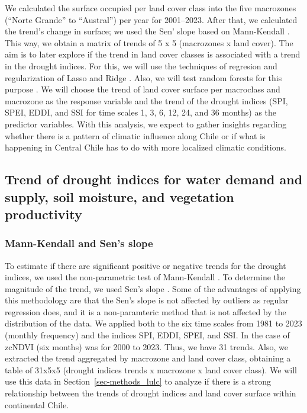 \documentclass[
  number,
  preprint,
  3p,
  onecolumn]{elsarticle}
\begin{document}
We calculated the surface occupied per land cover class into the five
macrozones (``Norte Grande'' to ``Austral'') per year for 2001--2023.
After that, we calculated the trend's change in surface; we used the
Sen' slope \citep{Sen1968} based on Mann-Kendall \citep{Kendall1975}.
This way, we obtain a matrix of trends of 5 x 5 (macrozones x land
cover). The aim is to later explore if the trend in land cover classes
is associated with a trend in the drought indices. For this, we will use
the techniques of regresion and regularization of Lasso
\citep{Tibshirani2010} and Ridge \citep{Hoerl1970}. Also, we will test
random forests for this purpose \citep{Ho1995}. We will choose the trend
of land cover surface per macroclass and macrozone as the response
variable and the trend of the drought indices (SPI, SPEI, EDDI, and SSI
for time scales 1, 3, 6, 12, 24, and 36 months) as the predictor
variables. With this analysis, we expect to gather insights regarding
whether there is a pattern of climatic influence along Chile or if what
is happening in Central Chile has to do with more localized climatic
conditions.

\hypertarget{trend-of-drought-indices-for-water-demand-and-supply-soil-moisture-and-vegetation-productivity}{%
\subsection{Trend of drought indices for water demand and supply, soil
moisture, and vegetation
productivity}\label{trend-of-drought-indices-for-water-demand-and-supply-soil-moisture-and-vegetation-productivity}}

\hypertarget{mann-kendall-and-sens-slope}{%
\subsubsection{Mann-Kendall and Sen's
slope}\label{mann-kendall-and-sens-slope}}

To estimate if there are significant positive or negative trends for the
drought indices, we used the non-parametric test of Mann-Kendall
\citep{Kendall1975}. To determine the magnitude of the trend, we used
Sen's slope \citep{Sen1968}. Some of the advantages of applying this
methodology are that the Sen's slope is not affected by outliers as
regular regression does, and it is a non-paramteric method that is not
affected by the distribution of the data. We applied both to the six
time scales from 1981 to 2023 (monthly frequency) and the indices SPI,
EDDI, SPEI, and SSI. In the case of zcNDVI (six months) was for 2000 to
2023. Thus, we have 31 trends. Also, we extracted the trend aggregated
by macrozone and land cover class, obtaining a table of 31x5x5 (drought
indices trends x macrozone x land cover class). We will use this data in
Section~\ref{sec-methods_lulc} to analyze if there is a strong
relationship between the trends of drought indices and land cover
surface within continental Chile.
\end{document}
